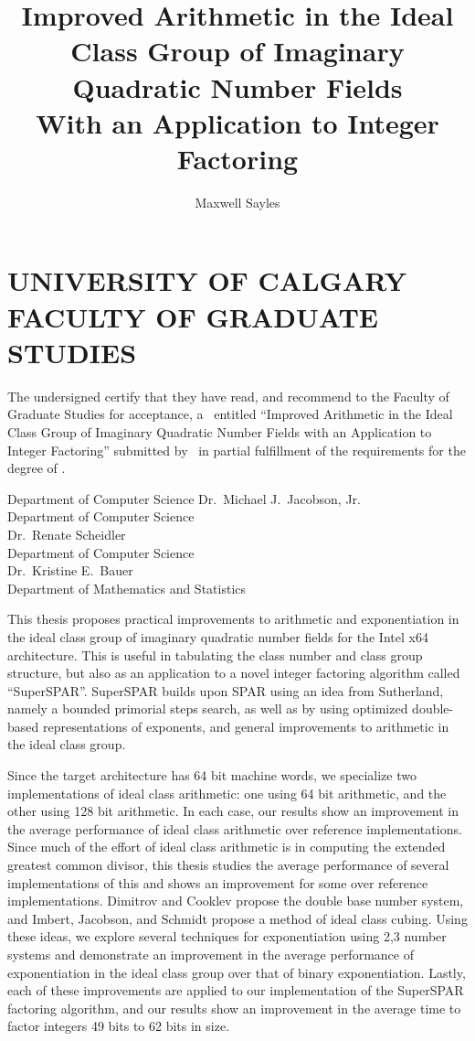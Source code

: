 \documentclass{ucalgthes1}
\title{Improved Arithmetic in the Ideal Class Group of Imaginary Quadratic Number Fields \\ \bigskip With an Application to Integer Factoring}
\author{Maxwell Sayles}
\newcommand{\thesistitle}{Improved Arithmetic in the Ideal Class Group of Imaginary Quadratic Number Fields with an Application to Integer Factoring}
\theoremstyle{definition}
\begin{document}
\makethesistitle
{}     %
\setcounter{page}{1}
\chapter*{UNIVERSITY OF CALGARY \\ FACULTY OF GRADUATE STUDIES}
\thispagestyle{empty}
The undersigned certify that they have read, and recommend
to the Faculty of Graduate Studies for acceptance, a \Thesis\ entitled
``\thesistitle'' submitted by \Author\
in partial fulfillment of the requirements for the degree of
\Degree.\\

%

\begin{signing}{Department of Computer Science}
\signline
Dr.~Michael J.~Jacobson, Jr. \\
Department of Computer Science \\
\signline
Dr.~Renate Scheidler \\
Department of Computer Science \\
\signline
Dr.~Kristine E.~Bauer \\
Department of Mathematics and Statistics \\
\end{signing}

\newpage
{}
{}

This thesis proposes practical improvements to arithmetic and exponentiation in the ideal class group of imaginary quadratic number fields for the Intel x64 architecture.  This is useful in tabulating the class number and class group structure, but also as an application to a novel integer factoring algorithm called ``SuperSPAR''.  SuperSPAR builds upon SPAR using an idea from Sutherland, namely a bounded primorial steps search, as well as by using optimized double-based representations of exponents, and general improvements to arithmetic in the ideal class group.

Since the target architecture has 64 bit machine words, we specialize two implementations of ideal class arithmetic: one using 64 bit arithmetic, and the other using 128 bit arithmetic.  In each case, our results show an improvement in the average performance of ideal class arithmetic over reference implementations.  Since much of the effort of ideal class arithmetic is in computing the extended greatest common divisor, this thesis studies the average performance of several implementations of this and shows an improvement for some over reference implementations.  Dimitrov and Cooklev propose the double base number system, and Imbert, Jacobson, and Schmidt propose a method of ideal class cubing.  Using these ideas, we explore several techniques for exponentiation using 2,3 number systems and demonstrate an improvement in the average performance of exponentiation in the ideal class group over that of binary exponentiation.  Lastly, each of these improvements are applied to our implementation of the SuperSPAR factoring algorithm, and our results show an improvement in the average time to factor integers 49 bits to 62 bits in size.
\end{document}
